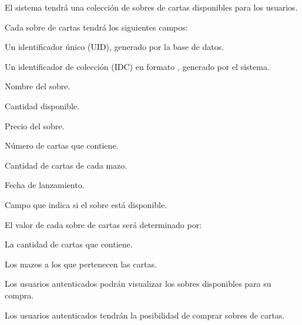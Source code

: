 

\hypertarget{req_sobres}{}

\begin{RFSobres}
	\item El sistema tendrá una colección de sobres de cartas disponibles para los usuarios.
	\begin{RFSobres}
		\item Cada sobre de cartas tendrá los siguientes campos:
		\begin{RFSobres}
			\item Un identificador único (UID), generado por la base de datos.
			\item Un identificador de colección (IDC) en formato , generado por el sistema.
			\item Nombre del sobre.
			\item Cantidad disponible.
			\item Precio del sobre.
			\item Número de cartas que contiene.
			\item Cantidad de cartas de cada mazo.
			\item Fecha de lanzamiento.
			\item Campo que indica si el sobre está disponible.
		\end{RFSobres}
		\item El valor de cada sobre de cartas será determinado por:
		\begin{RFSobres}
			\item La cantidad de cartas que contiene.
			\item Los mazos a los que pertenecen las cartas.
		\end{RFSobres}
	\end{RFSobres}
	\item Los usuarios autenticados podrán visualizar los sobres disponibles para su compra.
	\item Los usuarios autenticados tendrán la posibilidad de comprar sobres de cartas.\label{req_compra_sobres}

\end{RFSobres}
